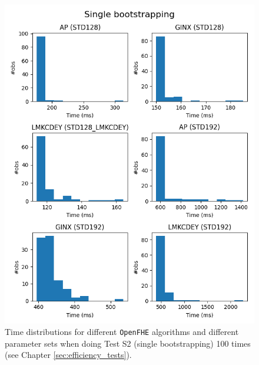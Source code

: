 \begin{figure}[ht]
    \centering
    \includegraphics[width=\textwidth]{data/figures/Single_bootstrapping_distributions_1.png}
    \caption{Time distributions for different \texttt{OpenFHE} algorithms and different parameter sets when doing Test S2 (single bootstrapping) 100 times (see Chapter \ref{sec:efficiency_tests}).}
    \label{fig:distr_single_bootstrap1}
\end{figure}

